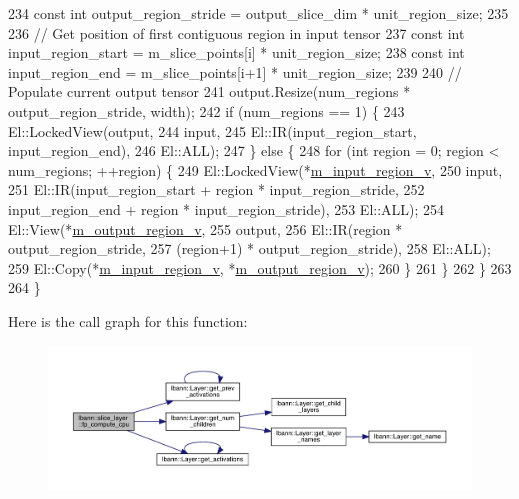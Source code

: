 \begin{DoxyCode}
234       \textcolor{keyword}{const} \textcolor{keywordtype}{int} output\_region\_stride = output\_slice\_dim * unit\_region\_size;
235 
236       \textcolor{comment}{// Get position of first contiguous region in input tensor}
237       \textcolor{keyword}{const} \textcolor{keywordtype}{int} input\_region\_start = m\_slice\_points[i] * unit\_region\_size;
238       \textcolor{keyword}{const} \textcolor{keywordtype}{int} input\_region\_end = m\_slice\_points[i+1] * unit\_region\_size;
239 
240       \textcolor{comment}{// Populate current output tensor}
241       output.Resize(num\_regions * output\_region\_stride, width);
242       \textcolor{keywordflow}{if} (num\_regions == 1) \{
243         El::LockedView(output,
244                        input,
245                        El::IR(input\_region\_start, input\_region\_end),
246                        El::ALL);
247       \} \textcolor{keywordflow}{else} \{
248         \textcolor{keywordflow}{for} (\textcolor{keywordtype}{int} region = 0; region < num\_regions; ++region) \{
249           El::LockedView(*\hyperlink{classlbann_1_1slice__layer_a3e64f86a9e999d3d72867c6009aa99ba}{m\_input\_region\_v},
250                          input,
251                          El::IR(input\_region\_start + region * input\_region\_stride,
252                                 input\_region\_end + region * input\_region\_stride),
253                          El::ALL);
254           El::View(*\hyperlink{classlbann_1_1slice__layer_a9d72208fc8136641e91cb208c38f8b65}{m\_output\_region\_v},
255                    output,
256                    El::IR(region * output\_region\_stride,
257                           (region+1) * output\_region\_stride),
258                    El::ALL);
259           El::Copy(*\hyperlink{classlbann_1_1slice__layer_a3e64f86a9e999d3d72867c6009aa99ba}{m\_input\_region\_v}, *\hyperlink{classlbann_1_1slice__layer_a9d72208fc8136641e91cb208c38f8b65}{m\_output\_region\_v});
260         \}
261       \}
262     \}
263 
264   \}
\end{DoxyCode}
Here is the call graph for this function\+:\nopagebreak
\begin{figure}[H]
\begin{center}
\leavevmode
\includegraphics[width=350pt]{classlbann_1_1slice__layer_ab4c95d24916534cdff58b32916171ff2_cgraph}
\end{center}
\end{figure}

